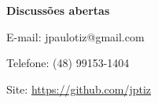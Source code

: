 {
    \begin{frame}[plain]
        \vspace{15mm}
        \begin{center}
            \textcolor{cinza}{\textbf{Discussões abertas}}
        \end{center}
        \vspace{-6mm}
        \begin{center}
        \textcolor{cinza}{
            \scriptsize{E-mail: jpaulotiz@gmail.com}}
        \end{center}
        \vspace{-6mm}
        \begin{center}
        \textcolor{cinza}{\scriptsize{Telefone: (48) 99153-1404}}
        \end{center}
        \vspace{-6mm}
        \begin{center}
        \textcolor{cinza}{\scriptsize{
            Site: \url{https://github.com/jptiz}
        }}
        \end{center}
    \end{frame}
}



